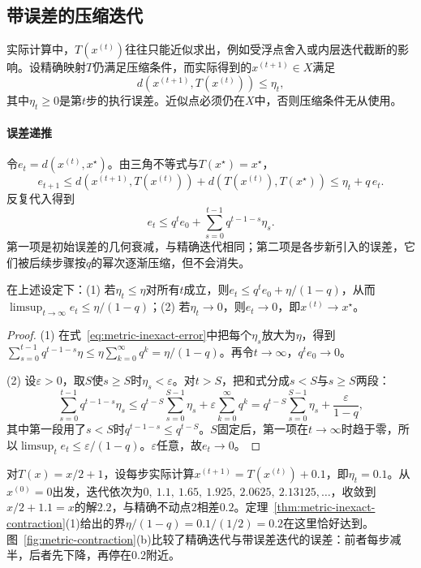 \subsection{带误差的压缩迭代}
\label{sec:metric-inexact-contraction}

实际计算中，$T(x^{(t)})$往往只能近似求出，例如受浮点舍入或内层迭代截断的影响。设精确映射$T$仍满足压缩条件，而实际得到的$x^{(t+1)}\in X$满足
\[
  d(x^{(t+1)},T(x^{(t)}))\leq\eta_t,
\]
其中$\eta_t\geq0$是第$t$步的执行误差。近似点必须仍在$X$中，否则压缩条件无从使用。

\paragraph{误差递推}
令$e_t=d(x^{(t)},x^\star)$。由三角不等式与$T(x^\star)=x^\star$，
\[
  e_{t+1}\leq d(x^{(t+1)},T(x^{(t)}))+d(T(x^{(t)}),T(x^\star))\leq\eta_t+q\,e_t.
\]
反复代入得到
\begin{equation}
\label{eq:metric-inexact-error}
  e_t\leq q^t e_0+\sum_{s=0}^{t-1}q^{t-1-s}\eta_s.
\end{equation}
第一项是初始误差的几何衰减，与精确迭代相同；第二项是各步新引入的误差，它们被后续步骤按$q$的幂次逐渐压缩，但不会消失。

\begin{theorem}[带误差的压缩迭代]
\label{thm:metric-inexact-contraction}
在上述设定下：(1) 若$\eta_t\leq\eta$对所有$t$成立，则$e_t\leq q^te_0+\eta/(1-q)$，从而$\limsup_{t\to\infty}e_t\leq\eta/(1-q)$；(2) 若$\eta_t\to0$，则$e_t\to0$，即$x^{(t)}\to x^\star$。
\end{theorem}

\begin{proof}
(1) 在式~\eqref{eq:metric-inexact-error}中把每个$\eta_s$放大为$\eta$，得到$\sum_{s=0}^{t-1}q^{t-1-s}\eta\leq\eta\sum_{k=0}^\infty q^k=\eta/(1-q)$。再令$t\to\infty$，$q^te_0\to0$。

(2) 设$\varepsilon>0$，取$S$使$s\geq S$时$\eta_s<\varepsilon$。对$t>S$，把和式分成$s<S$与$s\geq S$两段：
\[
  \sum_{s=0}^{t-1}q^{t-1-s}\eta_s
  \leq q^{t-S}\sum_{s=0}^{S-1}\eta_s+\varepsilon\sum_{k=0}^{\infty}q^k
  =q^{t-S}\sum_{s=0}^{S-1}\eta_s+\frac{\varepsilon}{1-q},
\]
其中第一段用了$s<S$时$q^{t-1-s}\leq q^{t-S}$。$S$固定后，第一项在$t\to\infty$时趋于零，所以$\limsup_te_t\leq\varepsilon/(1-q)$。$\varepsilon$任意，故$e_t\to0$。
\end{proof}

\begin{example}[固定执行误差]
\label{ex:metric-inexact-example}
对$T(x)=x/2+1$，设每步实际计算$x^{(t+1)}=T(x^{(t)})+0.1$，即$\eta_t=0.1$。从$x^{(0)}=0$出发，迭代依次为$0,\ 1.1,\ 1.65,\ 1.925,\ 2.0625,\ 2.13125,\dots$，收敛到$x/2+1.1=x$的解$2.2$，与精确不动点$2$相差$0.2$。定理~\ref{thm:metric-inexact-contraction}(1)给出的界$\eta/(1-q)=0.1/(1/2)=0.2$在这里恰好达到。图~\ref{fig:metric-contraction}(b)比较了精确迭代与带误差迭代的误差：前者每步减半，后者先下降，再停在$0.2$附近。
\end{example}

